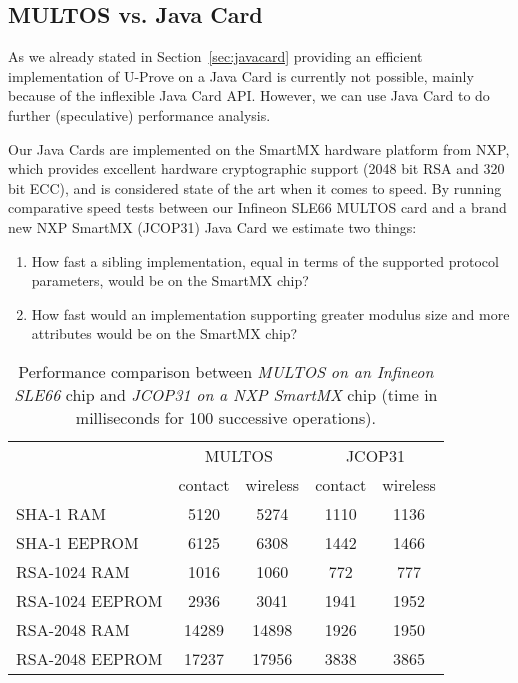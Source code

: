 \subsection{MULTOS vs. Java Card}

As we already stated in Section~\ref{sec:javacard} providing an efficient
implementation of U-Prove on a Java Card is currently not possible, mainly
because of the inflexible Java Card API. However, we can use Java Card to
do further (speculative) performance analysis.

Our Java Cards are implemented on the SmartMX hardware platform from
NXP, which provides excellent hardware cryptographic support (2048 bit
RSA and 320 bit ECC), and is considered state of the art when it
comes to speed. By running comparative speed tests between our Infineon
SLE66 MULTOS card and a brand new NXP SmartMX (JCOP31) Java Card we
estimate two things:
\begin{enumerate}
\item How fast a sibling implementation, equal in terms of the
  supported protocol parameters, would be on the SmartMX chip?
\item How fast would an implementation supporting greater modulus size
  and more attributes would be on the SmartMX chip?
\end{enumerate}

\begin{table}[b]
  \centering
  \caption{Performance comparison between \emph{MULTOS on an Infineon
    SLE66} chip and \emph{JCOP31 on a NXP SmartMX} chip (time in
    milliseconds for 100 successive operations).}
  \label{tab:comparison}
  \renewcommand{\tabcolsep}{1.25mm}
  \renewcommand{\arraystretch}{1.25}
  \begin{tabular}{l|c|c|c|c|}
     & \multicolumn{2}{c|}{MULTOS} & \multicolumn{2}{c|}{JCOP31} \\
     & contact & wireless & contact & wireless \\\hline
    SHA-1 RAM        &  5120 &  5274 & 1110 & 1136 \\\hline
    SHA-1 EEPROM    &  6125 &  6308 & 1442 & 1466 \\\hline
    RSA-1024 RAM     &  1016 &  1060 &  772 &  777 \\\hline
    RSA-1024 EEPROM &  2936 &  3041 & 1941 & 1952 \\\hline
    RSA-2048 RAM     & 14289 & 14898 & 1926 & 1950 \\\hline
    RSA-2048 EEPROM & 17237 & 17956 & 3838 & 3865 \\\hline
  \end{tabular}
\end{table}


